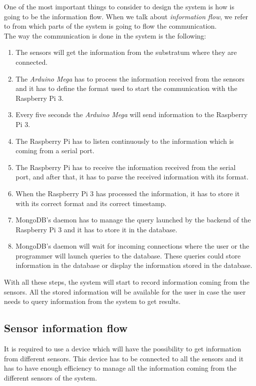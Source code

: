 One of the most important things to consider to design the system is how is going to be the information flow. When we talk about \textit{information flow}, we refer to from which parts of the system is going to flow the communication.\\

The way the communication is done in the system is the following:

\begin{enumerate}

\item The sensors will get the information from the substratum where they are connected.
\item The \textit{Arduino Mega} has to process the information received from the sensors and it has to define the format used to start the communication with the Raspberry Pi 3.
\item Every five seconds the \textit{Arduino Mega} will send information to the Raspberry Pi 3.
\item The Raspberry Pi has to listen continuously to the information which is coming from a serial port.
\item The Raspberry Pi has to receive the information received from the serial port, and after that, it has to parse the received information with its format.
\item When the Raspberry Pi 3 has processed the information, it has to store it with its correct format and its correct timestamp.
\item MongoDB's daemon has to manage the query launched by the backend of the Raspberry Pi 3 and it has to store it in the database.
\item MongoDB's daemon will wait for incoming connections where the user or the programmer will launch queries to the database. These queries could store information in the database or display the information stored in the database.
\end{enumerate}

With all these steps, the system will start to record information coming from the sensors. All the stored information will be available for the user in case the user needs to query information from the system to get results.

\subsection{Sensor information flow}

It is required to use a device which will have the possibility to get information from different sensors. This device has to be connected to all the sensors and it has to have enough efficiency to manage all the information coming from the different sensors of the system.\\ 

